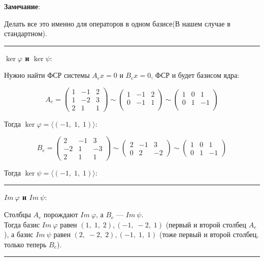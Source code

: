 \documentclass[11pt]{article}
\begin{document}
\textbf{Замечание}:

Делать все это именно для операторов в одном базисе(В нашем случае в стандартном).

\noindent\rule{\textwidth}{0.5pt}

\textbf{$\ker\varphi$ и $\ker\psi$}:

Нужно найти ФСР системы $A_ex=0$ и $B_ex=0$, ФСР и будет базисом ядра:

$$
A_e = 
\begin{pmatrix}
1 & -1 & 2 \\
1 & -2 & 3 \\
2 & 1 & 1
\end{pmatrix} \sim
\begin{pmatrix}
1 & -1 & 2 \\
0 & -1 & 1 \\
\end{pmatrix} \sim
\begin{pmatrix}
1 & 0 & 1 \\
0 & 1 & -1 \\
\end{pmatrix}
$$

Тогда $\ker \varphi = \langle (-1, \; 1, \; 1) \rangle$:

$$
B_e =
\begin{pmatrix}
2 & -1 & 3 \\
-2 & 1 & -3 \\
2 & 1 & 1
\end{pmatrix} \sim
\begin{pmatrix}
2 & -1 & 3 \\
0 & 2 & -2
\end{pmatrix} \sim
\begin{pmatrix}
1 & 0 & 1 \\
0 & 1 & -1
\end{pmatrix}
$$

Тогда $\ker \psi = \langle (-1, \; 1, \; 1) \rangle$:

\noindent\rule{\textwidth}{0.5pt}

\textbf{$Im \ \varphi$ и $Im \ \psi$}:

Столбцы $A_e$ порождают $Im \ \varphi$, а $B_e$ — $Im \ \psi$.\\
Тогда базис $Im \ \varphi$ равен $(1, \; 1, \; 2), (-1, \; -2, \; 1)$ (первый и второй столбец $A_e$), а базис $Im \ \psi$ равен $(2, \; -2, \; 2), (-1, \; 1, \; 1)$ (тоже первый и второй столбец, только теперь $B_e$).

\noindent\rule{\textwidth}{0.5pt}
\end{document}
